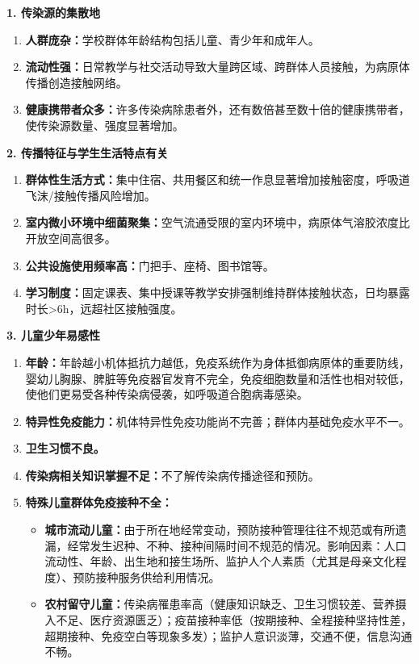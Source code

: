 \begin{keybox}
\textbf{1. 传染源的集散地}
\begin{enumerate}[leftmargin=*]
    \item \textbf{人群庞杂：}学校群体年龄结构包括儿童、青少年和成年人。
    \item \textbf{流动性强：}日常教学与社交活动导致大量跨区域、跨群体人员接触，为病原体传播创造接触网络。
    \item \textbf{健康携带者众多：}许多传染病除患者外，还有数倍甚至数十倍的健康携带者，使传染源数量、强度显著增加。
\end{enumerate}

\textbf{2. 传播特征与学生生活特点有关}
\begin{enumerate}[leftmargin=*]
    \item \textbf{群体性生活方式：}集中住宿、共用餐区和统一作息显著增加接触密度，呼吸道飞沫/接触传播风险增加。
    \item \textbf{室内微小环境中细菌聚集：}空气流通受限的室内环境中，病原体气溶胶浓度比开放空间高很多。
    \item \textbf{公共设施使用频率高：}门把手、座椅、图书馆等。
    \item \textbf{学习制度：}固定课表、集中授课等教学安排强制维持群体接触状态，日均暴露时长>6h，远超社区接触强度。
\end{enumerate}

\textbf{3. 儿童少年易感性}
\begin{enumerate}[leftmargin=*]
    \item \textbf{年龄：}年龄越小机体抵抗力越低，免疫系统作为身体抵御病原体的重要防线，婴幼儿胸腺、脾脏等免疫器官发育不完全，免疫细胞数量和活性也相对较低，使他们更易受各种传染病侵袭，如呼吸道合胞病毒感染。
    \item \textbf{特异性免疫能力：}机体特异性免疫功能尚不完善；群体内基础免疫水平不一。
    \item \textbf{卫生习惯不良。}
    \item \textbf{传染病相关知识掌握不足：}不了解传染病传播途径和预防。
    \item \textbf{特殊儿童群体免疫接种不全：}
    \begin{itemize}
        \item \textbf{城市流动儿童：}由于所在地经常变动，预防接种管理往往不规范或有所遗漏，经常发生迟种、不种、接种间隔时间不规范的情况。影响因素：人口流动性、年龄、出生地和接生场所、监护人个人素质（尤其是母亲文化程度）、预防接种服务供给利用情况。
        \item \textbf{农村留守儿童：}传染病罹患率高（健康知识缺乏、卫生习惯较差、营养摄入不足、医疗资源匮乏）；疫苗接种率低（按期接种、全程接种坚持性差，超期接种、免疫空白等现象多发）；监护人意识淡薄，交通不便，信息沟通不畅。
    \end{itemize}
\end{enumerate}
\end{keybox}

